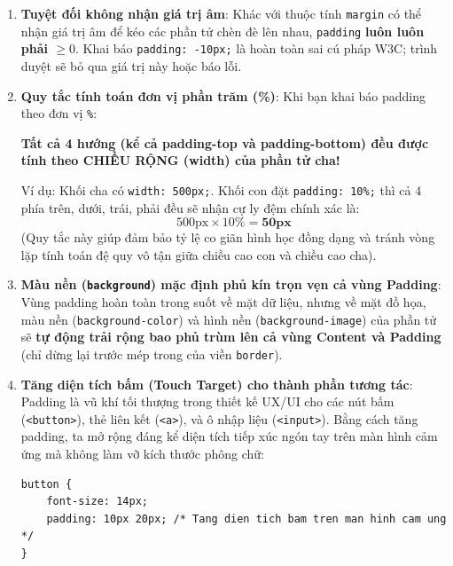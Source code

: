 \documentclass[11pt,oneside]{book}
\newcommand{\codeinline}[1]{\textcolor{accentOrange}{\texttt{#1}}}
\newcommand{\term}[1]{\textbf{\textcolor{primaryBlue}{#1}}}
\begin{document}
\begin{warnBox}
\begin{enumerate}[leftmargin=1.5em, itemsep=4pt, parsep=0pt]
    \item \textbf{Tuyệt đối không nhận giá trị âm}:
    Khác với thuộc tính \codeinline{margin} có thể nhận giá trị âm để kéo các phần tử chèn đè lên nhau, \codeinline{padding} \textbf{luôn luôn phải $\ge 0$}. Khai báo \codeinline{padding: -10px;} là hoàn toàn sai cú pháp W3C; trình duyệt sẽ bỏ qua giá trị này hoặc báo lỗi.

    \item \textbf{Quy tắc tính toán đơn vị phần trăm (\%)}:
    Khi bạn khai báo padding theo đơn vị \codeinline{\%}:
    \begin{center}
    \textcolor{primaryBlue}{\textbf{Tất cả 4 hướng (kể cả padding-top và padding-bottom) đều được tính theo CHIỀU RỘNG (width) của phần tử cha!}}
    \end{center}
    Ví dụ: Khối cha có \codeinline{width: 500px;}. Khối con đặt \codeinline{padding: 10\%;} thì cả 4 phía trên, dưới, trái, phải đều sẽ nhận cự ly đệm chính xác là:
    \[
    500\text{px} \times 10\% = \mathbf{50\text{px}}
    \]
    (Quy tắc này giúp đảm bảo tỷ lệ co giãn hình học đồng dạng và tránh vòng lặp tính toán đệ quy vô tận giữa chiều cao con và chiều cao cha).

    \item \textbf{Màu nền (\codeinline{background}) mặc định phủ kín trọn vẹn cả vùng Padding}:
    Vùng padding hoàn toàn trong suốt về mặt dữ liệu, nhưng về mặt đồ họa, màu nền (\codeinline{background-color}) và hình nền (\codeinline{background-image}) của phần tử sẽ \textbf{tự động trải rộng bao phủ trùm lên cả vùng Content và Padding} (chỉ dừng lại trước mép trong của viền \codeinline{border}).

    \item \textbf{Tăng diện tích bấm (\term{Touch Target}) cho thành phần tương tác}:
    Padding là vũ khí tối thượng trong thiết kế UX/UI cho các nút bấm (\codeinline{<button>}), thẻ liên kết (\codeinline{<a>}), và ô nhập liệu (\codeinline{<input>}). Bằng cách tăng padding, ta mở rộng đáng kể diện tích tiếp xúc ngón tay trên màn hình cảm ứng mà không làm vỡ kích thước phông chữ:
\begin{codeWindow}
\begin{lstlisting}[language=CSS3]
button {
    font-size: 14px;
    padding: 10px 20px; /* Tang dien tich bam tren man hinh cam ung */
}
\end{lstlisting}
\end{codeWindow}
\end{enumerate}
\end{warnBox}
\end{document}
